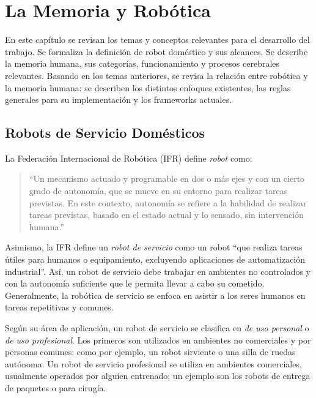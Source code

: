 
\chapter{La Memoria y Robótica}\label{chapter:memory}

En este capítulo se revisan los temas y conceptos relevantes para el desarrollo del trabajo. Se formaliza la definición de robot doméstico y sus alcances. Se describe la memoria humana, sus categorías, funcionamiento y procesos cerebrales relevantes. Basando en los temas anteriores, se revisa la relación entre robótica y la memoria humana: se describen los distintos enfoques existentes, las reglas generales para su implementación y los frameworks actuales.




\section{Robots de Servicio Domésticos}\label{sec:domestic_robots}

La Federación Internacional de Robótica (IFR) \cite{IFR} define \textit{robot} como:
\begin{quotation}
``Un mecanismo actuado y programable en dos o más ejes y con un cierto grado de autonomía, que se mueve en su entorno para realizar tareas previstas. En este contexto, autonomía se refiere a la habilidad de realizar tareas previstas, basado en el estado actual y lo sensado, sin intervención humana.''
\end{quotation}

Asimismo, la IFR define un \textit{robot de servicio} como un robot ``que realiza tareas útiles para humanos o equipamiento, excluyendo aplicaciones de automatización industrial''. Así, un robot de servicio debe trabajar en ambientes no controlados y con la autonomía suficiente que le permita llevar a cabo su cometido. Generalmente, la robótica de servicio se enfoca en asistir a los seres humanos en tareas repetitivas y comunes.

Según su área de aplicación, un robot de servicio se clasifica en \textit{de uso personal} o \textit{de uso profesional}. Los primeros son utilizados en ambientes no comerciales y por personas comunes; como por ejemplo, un robot sirviente o una silla de ruedas autónoma. Un robot de servicio profesional se utiliza en ambientes comerciales, usualmente operados por alguien entrenado; un ejemplo son los robots de entrega de paquetes o para cirugía.


